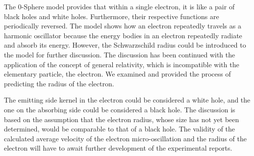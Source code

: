\documentclass[%
 reprint,
 amsmath,amssymb,
 aps,
]{revtex4-1}
\numberwithin{equation}{section}%
\begin{document}
The 0-Sphere model provides that within a single electron, it is like a pair of black holes and white holes. Furthermore, their respective functions are periodically reversed. The model shows how an electron repeatedly travels as a harmonic oscillator because the energy bodies in an electron repeatedly radiate and absorb its energy. However, the Schwarzschild radius could be introduced to the model for further discussion. The discussion has been continued with the application of the concept of general relativity, which is incompatible with the elementary particle, the electron. We examined and provided the process of predicting the radius of the electron.


The emitting side kernel in the electron could be considered a white hole, and the one on the absorbing side could be considered a black hole. The discussion is based on the assumption that the electron radius, whose size has not yet been determined, would be comparable to that of a black hole. The validity of the calculated  average velocity of the electron micro-oscillation and the radius of the electron will have to await further development of the experimental reports.



\end{document}
